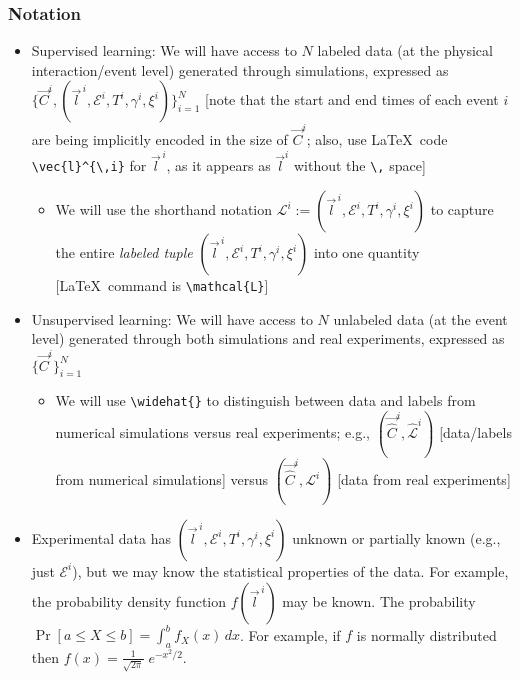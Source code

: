 \documentclass[]{article}
\providecommand{\tightlist}{%
  \setlength{\itemsep}{0pt}\setlength{\parskip}{0pt}}
\begin{document}
\subsubsection{Notation}

\begin{itemize}
\tightlist
\item
  Supervised learning: We will have access to \(N\) labeled data (at the physical interaction/event level) generated through simulations, expressed as
  \(\{\vec{C}^{i}, (\vec{l}^{\,i}, \mathcal{E}^i, T^i, \gamma^i, \xi^i)\}_{i=1}^N\)
  {[}note that the start and end times of each event \(i\) are being implicitly encoded in the size of \(\vec{C}^i\); also, use {\color{blue}\LaTeX\ code \verb|\vec{l}^{\,i}| for \(\vec{l}^{\,i}\), as it appears as \(\vec{l}^i\) without the \verb|\,| space}{]}

  \begin{itemize}
  \tightlist
  \item
    We will use the shorthand notation \(\mathcal{L}^i := (\vec{l}^{\,i}, \mathcal{E}^i, T^i, \gamma^i, \xi^i)\) to capture the entire \emph{labeled tuple} \((\vec{l}^{\,i}, \mathcal{E}^i, T^i, \gamma^i, \xi^i)\) into one quantity {[}{\color{blue}\LaTeX\ command is \verb|\mathcal{L}|}{]}
  \end{itemize}
\item
  Unsupervised learning: We will have access to \(N\) unlabeled data (at the event level) generated through both simulations and real experiments, expressed as \(\{\vec{C}^i\}_{i=1}^N\)

  \begin{itemize}
  \tightlist
  \item
    We will use \verb|\widehat{}| to distinguish between data and labels from numerical simulations versus real experiments; e.g., \((\vec{\widehat{C}}^i,\widehat{\mathcal{L}}^i)\) [data/labels from numerical simulations] versus \((\vec{\widehat{C}}^i,\mathcal{L}^i)\) [data from real experiments]
  \end{itemize}
\item
  Experimental data has $(\vec{l}^{\,i}, \mathcal{E}^i, T^i, \gamma^i, \xi^i)$ unknown or partially known (e.g., just  $\mathcal{E}^i$), but we may know the statistical properties of the data. For example, the probability density function $f(\vec{l}^{\,i})$ may be known.  The probability  $\Pr [a \le X \le b] = \int_a^b f_X(x) \, dx$.  For example, if $f$ is normally distributed then $f(x) = \frac{1}{\sqrt{2\pi}}\; e^{-x^2/2}$.
\end{itemize}
\end{document}
